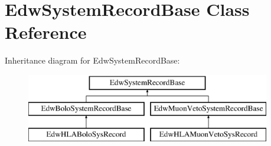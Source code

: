 \hypertarget{class_edw_system_record_base}{
\section{EdwSystemRecordBase Class Reference}
\label{class_edw_system_record_base}
}
Inheritance diagram for EdwSystemRecordBase:\begin{figure}[H]
\begin{center}
\leavevmode
\includegraphics[height=3cm]{class_edw_system_record_base}
\end{center}
\end{figure}
